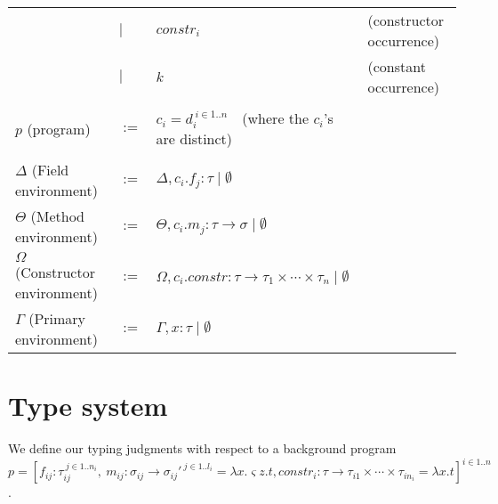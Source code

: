 \documentclass{article}
\begin{document}
\begin{tabular}{llll}
              & $\mid$ & $\mathit{constr}_i$ & (constructor occurrence) \\
              & $\mid$ & $\mathit{k}$ & (constant occurrence) \\
 & & & \\
$p$ (program) & $:=$ & $c_i = d_i^{~i \in 1..n}$~~(where the $c_i$'s are distinct) & \\
\if 0
 & & & \\
$\Delta$ (Field environment) & $:=$ & $\Delta,c_i.f_j : \tau \mid \emptyset$ & \\
$\Theta$ (Method environment) & $:=$ & $\Theta,c_i.m_j : \tau \to \sigma \mid \emptyset$ & \\
$\Omega$ (Constructor environment) & $:=$ & $\Omega,c_i.\mathit{constr} : \tau \to \tau_1 \times \cdots \times \tau_n \mid \emptyset$ & \\
\fi
$\Gamma$ (Primary environment) & $:=$ & $\Gamma,x:\tau \mid \emptyset$ & 
\end{tabular}

\section{Type system}

We define our typing judgments with respect to a background program $p = [f_{ij} : \tau_{ij}^{~j \in 1..n_i},~m_{ij} : \sigma_{ij} \to \sigma_{ij}'^{~j \in 1..l_i} = \lambda x. \varsigma z. t, \mathit{constr}_i : \tau \to \tau_{i1} \times \cdots \times \tau_{in_i} = \lambda x.t]^{i \in 1..n}$.
\end{document}
